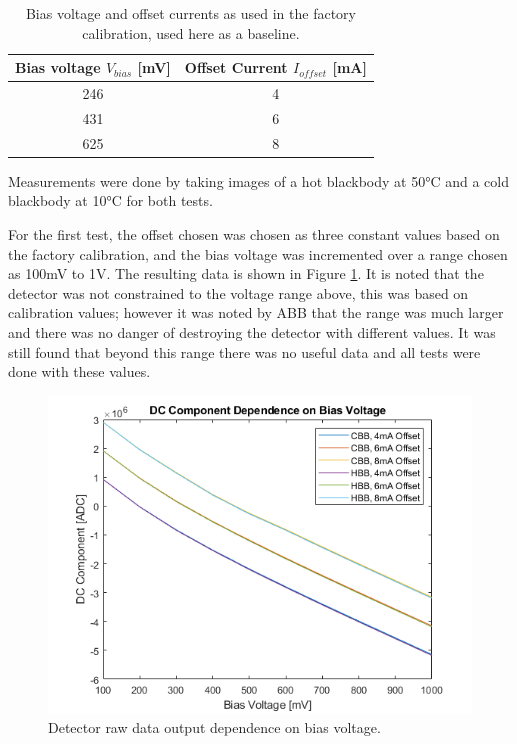 \begin{table}[h]
\begin{center}
\begin{tabular}{ |c|c| } 
 \hline
 \rowcolor{lightgray}
 Bias voltage $V_{bias}$ [mV] &  Offset Current $I_{offset}$ [mA]\\ 
 \hline
  246 & 4 \\ 
  \hline
 431 & 6  \\
 \hline
 625 & 8 \\
 \hline
 \end{tabular}
\end{center}
\caption{Bias voltage and offset currents as used in the factory calibration, used here as a baseline.}
\label{vbias_ioffset_table}
\end{table}

Measurements were done by taking images of a hot blackbody at 50°C and a cold blackbody at 10°C for both tests.

For the first test, the offset chosen was chosen as three constant values based on the factory calibration, and the bias voltage was incremented over a range chosen as 100mV to 1V. The resulting data is shown in Figure \ref{fig:dc_dep_on_bias}. It is noted that the detector was not constrained to the voltage range above, this was based on calibration values; however it was noted by ABB that the range was much larger and there was no danger of destroying the detector with different values. It was still found that beyond this range there was no useful data and all tests were done with these values.

\begin{figure}[h]
  \centering
  \includegraphics[width=0.9\linewidth]{chap6_images/verification/dc_component_dependence_on_bias_voltage.png}
  \caption{Detector raw data output dependence on bias voltage.}
  \label{fig:dc_dep_on_bias}
\end{figure}

